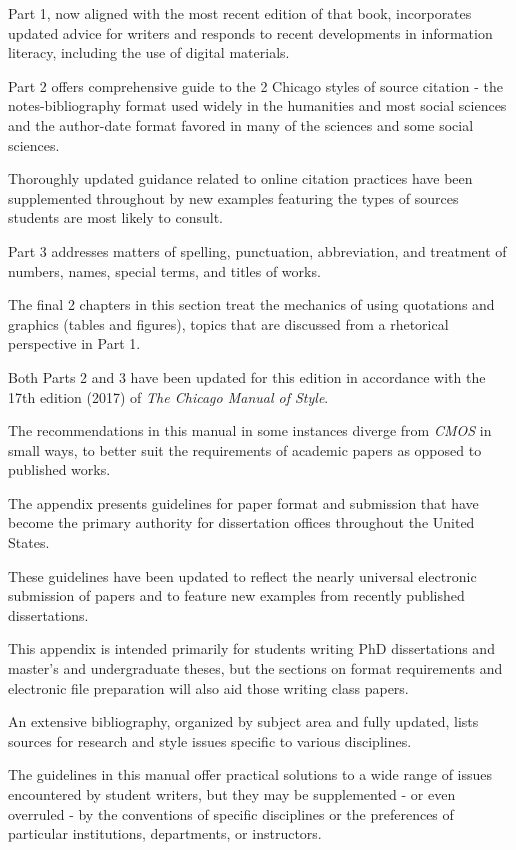 \documentclass[oneside]{book}
\numberwithin{equation}{section}
\begin{document}
%
Part 1, now aligned with the most recent edition of that book, incorporates updated advice for writers and responds to recent developments in information literacy, including the use of digital materials.

Part 2 offers comprehensive guide to the 2 Chicago styles of source citation - the notes-bibliography format used widely in the humanities and most social sciences and the author-date format favored in many of the sciences and some social sciences.

Thoroughly updated guidance related to online citation practices have been supplemented throughout by new examples featuring the types of sources students are most likely to consult.

Part 3 addresses matters of spelling, punctuation, abbreviation, and treatment of numbers, names, special terms, and titles of works.

The final 2 chapters in this section treat the mechanics of using quotations and graphics (tables and figures), topics that are discussed from a rhetorical perspective in Part 1.

Both Parts 2 and 3 have been updated for this edition in accordance with the 17th edition (2017) of \textit{The Chicago Manual of Style}.

The recommendations in this manual in some instances diverge from \textit{CMOS} in small ways, to better suit the requirements of academic papers as opposed to published works.

%
The appendix presents guidelines for paper format and submission that have become the primary authority for dissertation offices throughout the United States.

These guidelines have been updated to reflect the nearly universal electronic submission of papers and to feature new examples from recently published dissertations.

This appendix is intended primarily for students writing PhD dissertations and master's and undergraduate theses, but the sections on format requirements and electronic file preparation will also aid those writing class papers.

An extensive bibliography, organized by subject area and fully updated, lists sources for research and style issues specific to various disciplines.

%
The guidelines in this manual offer practical solutions to a wide range of issues encountered by student writers, but they may be supplemented - or even overruled - by the conventions of specific disciplines or the preferences of particular institutions, departments, or instructors.
\end{document}
